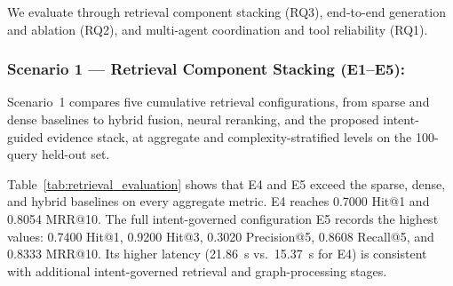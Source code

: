 We evaluate \system{} through retrieval component stacking (RQ3), end-to-end generation and ablation (RQ2), and multi-agent coordination and tool reliability (RQ1).

\subsubsection{Scenario 1 --- Retrieval Component Stacking (E1--E5):}
Scenario~1 compares five cumulative retrieval configurations, from sparse and dense baselines to hybrid fusion, neural reranking, and the proposed intent-guided evidence stack, at aggregate and complexity-stratified levels on the 100-query held-out set.

Table~\ref{tab:retrieval_evaluation} shows that E4 and E5 exceed the sparse, dense, and hybrid baselines on every aggregate metric. E4 reaches 0.7000 Hit@1 and 0.8054 MRR@10. The full intent-governed configuration E5 records the highest values: 0.7400 Hit@1, 0.9200 Hit@3, 0.3020 Precision@5, 0.8608 Recall@5, and 0.8333 MRR@10. Its higher latency (21.86~s vs.\ 15.37~s for E4) is consistent with additional intent-governed retrieval and graph-processing stages.

\begin{table}[!htbp]
\centering
\caption{Scenario 1: Progressive retrieval component stacking on the redesigned Held-Out Test Set ($N=100$).}
\label{tab:retrieval_evaluation}
\end{table}

